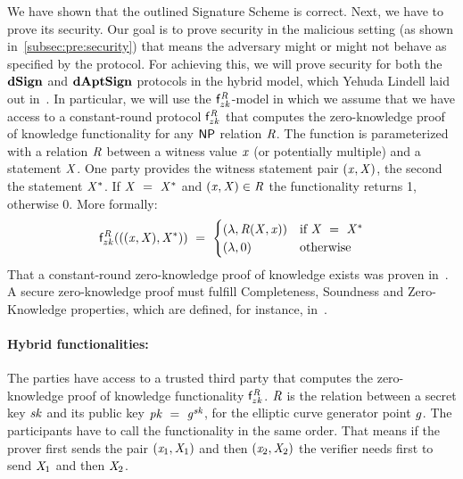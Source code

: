 We have shown that the outlined Signature Scheme is correct.
Next, we have to prove its security.
Our goal is to prove security in the malicious setting (as shown in~\cref{subsec:pre:security}) that means the adversary might or might not behave as specified by the protocol.
For achieving this, we will prove security for both the $\mathbf{dSign}$ and $\mathbf{dAptSign}$ protocols in the hybrid model, which Yehuda Lindell laid out in~\cite{lindell2017simulate}.
In particular, we will use the $\mathsf{f}^{\mathit{R}}_{zk}$-model in which we assume that we have access to a constant-round protocol $\mathsf{f}^{\mathit{R}}_{zk}$ that computes the zero-knowledge proof of knowledge functionality for any $\mathsf{NP}$ relation $\mathit{R}$.
The function is parameterized with a relation $\mathit{R}$ between a witness value $\mathit{x}$ (or potentially multiple)  and a statement $\mathit{X}$.
One party provides the witness statement pair $(\mathit{x}, \mathit{X})$, the second the statement $\mathit{X}^*$.
If $\mathit{X} ~=~ \mathit{X}^*$ and $(\mathit{x}, \mathit{X}) \in \mathit{R}$ the functionality returns 1, otherwise 0.
More formally:
\[
    \mathsf{f}^{\mathit{R}}_{zk}(((\mathit{x}, \mathit{X}), \mathit{X}^*)) ~=~
    \begin{cases}
        (\lambda, \mathit{R}(\mathit{X}, \mathit{x})) & \text{if } \mathit{X} ~=~ \mathit{X}^* \\
        (\lambda, 0) &\text{otherwise}
    \end{cases}
\]
That a constant-round zero-knowledge proof of knowledge exists was proven in~\cite{lindell2013note}.
A secure zero-knowledge proof must fulfill Completeness, Soundness and Zero-Knowledge properties, which are defined, for instance, in~\cite{groth2010short}.

\paragraph{Hybrid functionalities:} The parties have access to a trusted third party that computes the zero-knowledge proof of knowledge functionality $\mathsf{f}^{\mathit{R}}_{zk}$.
$\mathit{R}$ is the relation between a secret key $\mathit{sk}$ and its public key $\mathit{pk} ~=~ \mathit{g}^{\mathit{sk}}$, for the elliptic curve generator point $\mathit{g}$.
The participants have to call the functionality in the same order.
That means if the prover first sends the pair $(\mathit{x}_1, \mathit{X}_1)$ and then $(\mathit{x}_2, \mathit{X}_2)$ the verifier needs first to send $\mathit{X}_1$ and then $\mathit{X}_2$.

